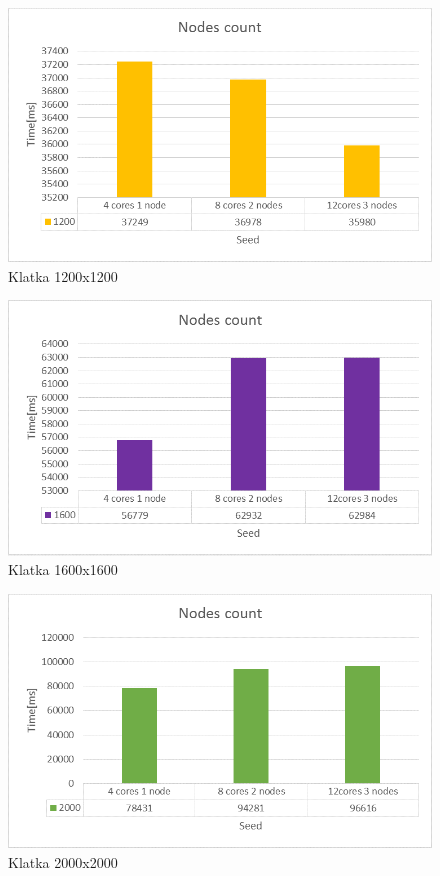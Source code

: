 \documentclass[a4paper]{article}
\begin{document}
\begin{figure}[H]
    \centering
    \includegraphics[width=\textwidth]{4-3.png}
    \caption{Klatka 1200x1200}
    \label{fig:my_frac}
\end{figure}
\begin{figure}[H]
    \centering
    \includegraphics[width=\textwidth]{5-1.png}
    \caption{Klatka 1600x1600}
    \label{fig:my_frac}
\end{figure}
\begin{figure}[H]
    \centering
    \includegraphics[width=\textwidth]{5-2.png}
    \caption{Klatka 2000x2000}
    \label{fig:my_frac}
\end{figure}
\end{document}
